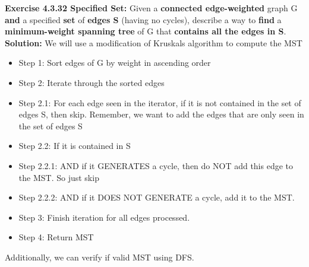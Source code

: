 \documentclass[11pt,fleqn]{article}
\begin{document}
\textbf{Exercise 4.3.32 Specified Set:} Given a \textbf{connected edge-weighted} graph G \textbf{and} a specified \textbf{set} of
\textbf{edges S} (having no cycles), describe a way to \textbf{find} a \textbf{minimum-weight spanning tree} of
G that \textbf{contains all the edges in S}.\\

\textbf{Solution:} We will use a modification of Kruskals algorithm to compute the MST

\begin{itemize}
	\item Step 1: Sort edges of G by weight in ascending order
	\item Step 2: Iterate through the sorted edges
	\item Step 2.1: For each edge seen in the iterator, if it is not contained in the set of edges S, then skip. Remember, we want to add the edges that are only seen in the set of edges S
	\item Step 2.2: If it is contained in S
	\item Step 2.2.1: AND if it GENERATES a cycle, then do NOT add this edge to the MST. So just skip
	\item Step 2.2.2: AND if it DOES NOT GENERATE a cycle, add it to the MST.
	\item Step 3: Finish iteration for all edges processed.
	\item Step 4: Return MST
\end{itemize}

Additionally, we can verify if valid MST using DFS.
\end{document}
